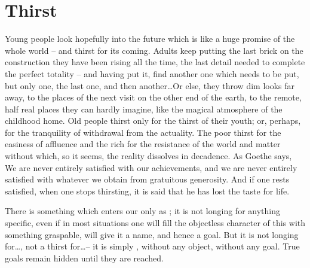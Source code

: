 \section{Thirst}%

\pa\label{pa:thirst} Young people look hopefully into the future which is like
a huge promise of the whole world -- and thirst for its coming. Adults keep
putting the last 
brick on the construction they have been rising all the time, the last detail
needed to complete the perfect totality -- and having put it, find another one
which needs to be put, but only one, the last one, and then another\ldots Or else,
they throw dim looks far away, to the places of the next visit on the other end
of the earth, to the remote, half real places they can hardly imagine, like the
magical atmosphere of the childhood home.  Old people thirst only for the thirst
of their youth; or, perhaps, for the tranquility of withdrawal from the
actuality.  The poor thirst for the easiness of affluence and the rich for the
resistance of the world and matter without which, so it seems, the reality
dissolves in decadence. As Goethe says,  We are never entirely satisfied with our achievements,
and we are never entirely satisfied with whatever we obtain from gratuitous
generosity. And if one rests satisfied, when one stops thirsting, it is said
that he has lost the taste for life.

 There is something which enters
our  only as ; it is not longing for anything
specific, even if in most situations one will fill the objectless character of
this  with something graspable, will give it a name, and hence a
goal. But it is not longing for\ldots, not a thirst for\ldots  -- it is simply
, without any object, without any goal. True goals remain hidden
until they are reached.

